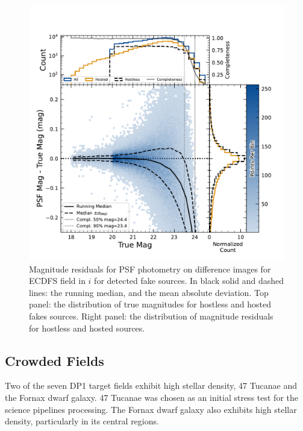 \begin{figure}
    \centering
    \includegraphics[width=\linewidth]{figures/hexbin_psf_mag.pdf}
    \caption{Magnitude residuals for PSF photometry on difference images for ECDFS field in $i$ for detected fake sources. In black solid and dashed lines: the running median, and the mean absolute deviation. Top panel: the distribution of true magnitudes for hostless and hosted fakes sources. Right panel: the distribution of magnitude residuals for hostless and hosted sources.}
    \label{fig:phot_residual_diffim_fakes}
\end{figure}

\subsection{Crowded Fields}
Two of the seven DP1 target fields exhibit high stellar density, 47 Tucanae and the Fornax dwarf galaxy.
47 Tucanae was chosen as an initial stress test for the science pipelines processing. 
The Fornax dwarf galaxy also exhibits high stellar density, particularly in its central regions.
